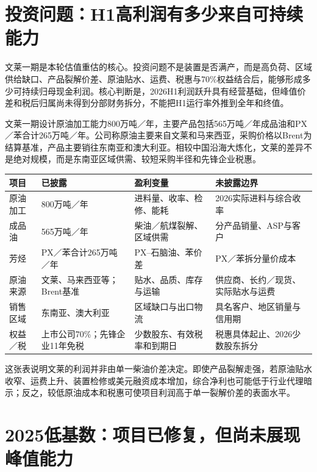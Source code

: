 \section{投资问题：H1高利润有多少来自可持续能力}

文莱一期是本轮估值重估的核心。投资问题不是装置是否满产，而是高负荷、区域供给缺口、产品裂解价差、原油贴水、运费、税惠与70\%权益结合后，能够形成多少可持续归母现金利润。核心判断是，2026H1利润跃升具有经营基础，但峰值价差和税后归属尚未得到分部财务拆分，不能把H1运行率外推到全年和终值。

文莱一期设计原油加工能力800万吨／年，主要产品包括565万吨／年成品油和PX／苯合计265万吨／年。公司称原油主要来自文莱和马来西亚，采购价格以Brent为结算基准，产品主要销往东南亚和澳大利亚。相较中国沿海大炼化，文莱的差异不是绝对规模，而是东南亚区域供需、较短采购半径和先锋企业税惠。

\begin{exhibitbox}[文莱一期资产与经济变量]
\noindent\begin{tabularx}{\textwidth}{L{3.15cm}L{2.4cm}L{2.8cm}X}
\toprule
\textbf{项目} & \textbf{已披露} & \textbf{盈利变量} & \textbf{未披露边界} \\
\midrule
原油加工 & 800万吨／年 & 进料量、收率、检修、能耗 & 2026实际进料与综合收率 \\
成品油 & 565万吨／年 & 柴油／航煤裂解、区域供需 & 分产品销量、ASP与客户 \\
芳烃 & PX／苯合计265万吨／年 & PX--石脑油、苯价差 & PX／苯拆分量价成本 \\
原油来源 & 文莱、马来西亚等；Brent基准 & 贴水、品质、库存与运输 & 供应商、长约／现货、实际贴水与运费 \\
销售区域 & 东南亚、澳大利亚 & 区域缺口与出口物流 & 具名客户、地区销量与信用期 \\
权益／税 & 上市公司70\%；先锋企业11年免税 & 少数股东、有效税率和到期日 & 税惠具体起止、2026少数股东拆分 \\
\bottomrule
\end{tabularx}
\end{exhibitbox}

这张表说明文莱的利润并非由单一柴油价差决定。即使产品裂解走强，若原油贴水收窄、运费上升、装置检修或美元融资成本增加，综合净利也可能低于行业代理暗示；反之，较低原油成本和税惠可使项目利润高于单一裂解价差的表面水平。

\section{2025低基数：项目已修复，但尚未展现峰值能力}

